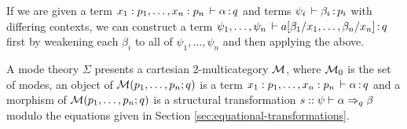 If we are given a term $x_1:p_1, \dots, x_n:p_n \, \vdash \alpha \, \mathit{:} \, q$ and terms $\psi_i \, \vdash \beta_i \, \mathit{:} \, p_i$ with differing contexts, we can construct a term $\psi_1, \dots, \psi_n \, \vdash a[\beta_1/x_1, \dots, \beta_n/x_n] \, \mathit{:} \, q$ first by weakening each $\beta_i$ to all of $\psi_1, \dots, \psi_n$ and then applying the above.

\begin{theorem}
\label{thm:completeness-mode-theory}
A mode theory $\Sigma$ presents a cartesian 2-multicategory $\mathcal{M}$, where
$\mathcal{M}_0$ is the set of modes, an object of $\mathcal{M}(p_1,\ldots,p_n;q)$ is a
term $x_1:p_1,\ldots,x_n:p_n \, \vdash \alpha \, \mathit{:} \, q$ and a morphism of $\mathcal{M}(p_1,\ldots,p_n;q)$ is a structural transformation
$s :: \psi \vdash \alpha \Rightarrow_{q} \beta$ modulo the equations given in Section \ref{sec:equational-transformations}.  
\end{theorem}
